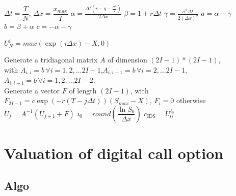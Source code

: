 \begin{algorithm}[H]
	$\Delta t = \dfrac{T}{N}$, 
	$\Delta x = \dfrac{x_{max}}{I}$\;
	$\alpha = \frac{\Delta t(r - q - \frac{\sigma^{2}}{2})}{2\Delta x}$\;
	$\beta = 1+ r \Delta t$\;
	$\gamma = \frac{\sigma^{2}\Delta t}{2(\Delta x)^{2}}$\;
	$a = \alpha - \gamma$\;
	$b = \beta + \alpha$\;
	$c = -\alpha - \gamma$\;
	
	 {
		$U_{N}^{i} = max(\exp(i\Delta x) - X, 0)$\;
	}
	
	Generate a tridiagonal matrix $A$ of dimension $(2I-1) * (2I-1)$, \\
	with $A_{i,i} = b\, \forall i = 1, 2, \dots 2I-1$,$A_{i,i-1} = b\, \forall i = 2, \dots 2I-1$, $A_{i,i+1} = b\, \forall i = 1, 2, \dots 2I-2$.\\
	
	 {
		Generate a vector $F$ of length $(2I-1)$, with $F_{2I-1} = c\exp(-r(T-j \Delta t))(S_{max} - X)$, $F_{i} = 0$ otherwise\;
		$U_{j} = A^{-1} (U_{j+1} + F)$\;
	}
	$i_0 = round \left (\dfrac{\ln{S_0}}{\Delta x} \right )$\;
	$c_{\text{IDS}} = U_0^{i_0}$\;
	
\end{algorithm}


\section{Valuation of digital call option}

\subsection{Algo}



